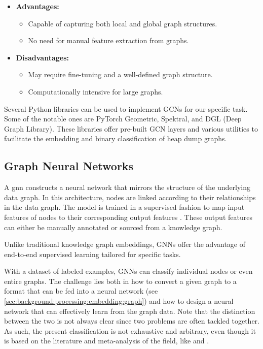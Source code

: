     \begin{itemize}
        \item \textbf{Advantages:}
        \begin{itemize}
            \item Capable of capturing both local and global graph structures.
            \item No need for manual feature extraction from graphs.
        \end{itemize}
        \item \textbf{Disadvantages:}
        \begin{itemize}
            \item May require fine-tuning and a well-defined graph structure.
            \item Computationally intensive for large graphs.
        \end{itemize}
    \end{itemize}

    Several Python libraries can be used to implement GCNs for our specific task. Some of the notable ones are PyTorch Geometric, Spektral, and DGL (Deep Graph Library). These libraries offer pre-built GCN layers and various utilities to facilitate the embedding and binary classification of heap dump graphs.

    \subsection{Graph Neural Networks}
    A \acrfull{gnn} constructs a neural network that mirrors the structure of the underlying data graph. In this architecture, nodes are linked according to their relationships in the data graph. The model is trained in a supervised fashion to map input features of nodes to their corresponding output features \cite{KG22}. These output features can either be manually annotated or sourced from a knowledge graph. 

    Unlike traditional knowledge graph embeddings, GNNs offer the advantage of end-to-end supervised learning tailored for specific tasks. 
    
    With a dataset of labeled examples, GNNs can classify individual nodes or even entire graphs. The challenge lies both in how to convert a given graph to a format that can be fed into a neural network (see \ref{sec:background:processing:embedding:graph}) and how to design a neural network that can effectively learn from the graph data. Note that the distinction between the two is not always clear since two problems are often tackled together. As such, the present classification is not exhaustive and arbitrary, even though it is based on the literature and meta-analysis of the field, like  \cite{KG22} and  \cite{GNNComprehensiveSurvey20}.
    
